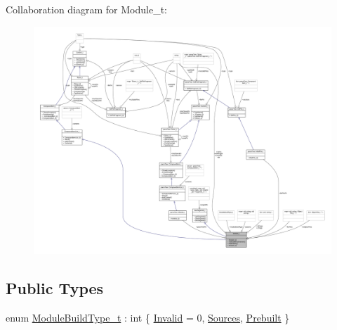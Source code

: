 Collaboration diagram for Module\+\_\+t\+:
\nopagebreak
\begin{figure}[H]
\begin{center}
\leavevmode
\includegraphics[width=350pt]{struct_module__t__coll__graph}
\end{center}
\end{figure}
\subsection*{Public Types}
\begin{DoxyCompactItemize}
\item 
enum \hyperlink{struct_module__t_a889284dddd5ba67aa7bcf51040e49c7d}{Module\+Build\+Type\+\_\+t} \+: int \{ \hyperlink{struct_module__t_a889284dddd5ba67aa7bcf51040e49c7dad602bb2eeabf5c8920dc9135d92edf20}{Invalid} = 0, 
\hyperlink{struct_module__t_a889284dddd5ba67aa7bcf51040e49c7dadf43c7c1bec780859d8e1b28893cf10f}{Sources}, 
\hyperlink{struct_module__t_a889284dddd5ba67aa7bcf51040e49c7da7fd081c0762964b6a6b9dc0fe5f0f00c}{Prebuilt}
 \}
\end{DoxyCompactItemize}

